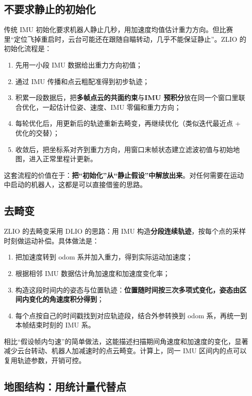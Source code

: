 \subsection{不要求静止的初始化}

传统 IMU 初始化要求机器人静止几秒，用加速度均值估计重力方向。但比赛里“定位飞掉重启时，云台可能还在跟随自瞄转动，几乎不能保证静止”。ZLIO 的初始化流程是：
\begin{enumerate}
  \item 先用一小段 IMU 数据给出重力方向初值；
  \item 通过 IMU 传播和点云粗配准得到初步轨迹；
  \item 积累一段数据后，把\textbf{多帧点云的共面约束}与\textbf{IMU 预积分}放在同一个窗口里联合优化，一起估计位姿、速度、IMU 零偏和重力方向；
  \item 每轮优化后，用更新后的轨迹重新去畸变，再继续优化（类似迭代最近点 + 优化的交替）；
  \item 收敛后，把坐标系对齐到重力方向，用窗口末帧状态建立滤波初值与初始地图，进入正常里程计更新。
\end{enumerate}

这套流程的价值在于：\textbf{把“初始化”从“静止假设”中解放出来}。对任何需要在运动中启动的机器人，这都是可以直接借鉴的思路。

\subsection{去畸变}

ZLIO 的去畸变采用 DLIO\cite{chen2023dlio} 的思路：用 IMU 构造\textbf{分段连续轨迹}，按每个点的采样时刻做运动补偿。具体做法是：
\begin{enumerate}
  \item 把加速度转到 odom 系并加入重力，得到实际运动加速度；
  \item 根据相邻 IMU 数据估计角加速度和加速度变化率；
  \item 构造这段时间内的姿态与位置轨迹：\textbf{位置随时间按三次多项式变化，姿态由区间内变化的角速度积分得到}；
  \item 每个点按自己的时间戳找到对应轨迹段，结合外参转换到 odom 系，再统一到本帧结束时刻的 IMU 系。
\end{enumerate}

相比“假设帧内匀速”的简单做法，这能描述扫描期间角速度和加速度的变化，显著减少云台转动、机器人加减速时的点云畸变。计算上，同一 IMU 区间内的点可以复用轨迹参数，开销可控。

\subsection{地图结构：用统计量代替点}

